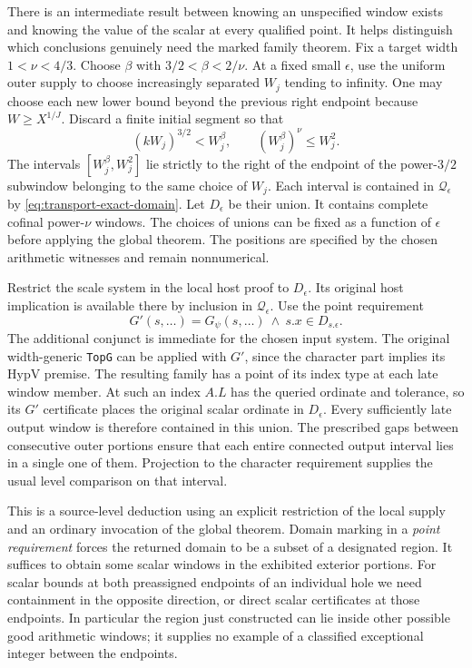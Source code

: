 \documentclass[12pt,letterpaper]{article}
\begin{document}
There is an intermediate result between knowing an unspecified window exists and knowing the value of the scalar at every qualified point. It helps distinguish which conclusions genuinely need the marked family theorem. Fix a target width \(1<\nu<4/3\). Choose \(\beta\) with \(3/2<\beta<2/\nu\). At a fixed small \(\epsilon\), use the uniform outer supply to choose increasingly separated \(W_j\) tending to infinity. One may choose each new lower bound beyond the previous right endpoint because \(W\ge X^{1/J}\). Discard a finite initial segment so that
\[
      (kW_j)^{3/2} < W_j^\beta,\qquad
      (W_j^\beta)^\nu \le W_j^2 .
\]
The intervals \([W_j^\beta,W_j^2]\) lie strictly to the right of the endpoint of the power-\(3/2\) subwindow belonging to the same choice of \(W_j\). Each interval is contained in \(\mathcal Q_\epsilon\) by \eqref{eq:transport-exact-domain}. Let \(D_\epsilon\) be their union. It contains complete cofinal power-\(\nu\) windows. The choices of unions can be fixed as a function of \(\epsilon\) before applying the global theorem. The positions are specified by the chosen arithmetic witnesses and remain nonnumerical.

Restrict the scale system in the local host proof to \(D_\epsilon\). Its original host implication is available there by inclusion in \(\mathcal Q_\epsilon\). Use the point requirement
\[
              G'(s,\ldots)=G_\psi(s,\ldots)\ \wedge\ s.x\in D_{s.\epsilon}.
\]
The additional conjunct is immediate for the chosen input system. The original width-generic \texttt{TopG} can be applied with \(G'\), since the character part implies its \(\mathrm{HypV}\) premise. The resulting family has a point of its index type at each late window member. At such an index \(A.L\) has the queried ordinate and tolerance, so its \(G'\) certificate places the original scalar ordinate in \(D_\epsilon\). Every sufficiently late output window is therefore contained in this union. The prescribed gaps between consecutive outer portions ensure that each entire connected output interval lies in a single one of them. Projection to the character requirement supplies the usual level comparison on that interval.

This is a source-level deduction using an explicit restriction of the local supply and an ordinary invocation of the global theorem. Domain marking in a \emph{point requirement} forces the returned domain to be a subset of a designated region. It suffices to obtain some scalar windows in the exhibited exterior portions. For scalar bounds at both preassigned endpoints of an individual hole we need containment in the opposite direction, or direct scalar certificates at those endpoints. In particular the region just constructed can lie inside other possible good arithmetic windows; it supplies no example of a classified exceptional integer between the endpoints.
\end{document}
